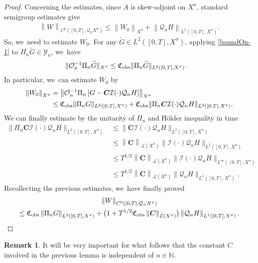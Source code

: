 \documentclass[10pt]{amsart}
\theoremstyle{definition}
\newtheorem{remark}[theorem]{Remark}
\let\mc\mathcal
\renewcommand{\O}{\mc{O}}
\newcommand{\Y}{\mc{Y}}
\newcommand{\N}{\mathbb{N}}
\newcommand{\Q}{\mathcal{Q}}
\newcommand{\bC}{\boldsymbol{C}}
\providecommand{\norm}[1]{\lVert#1\rVert}
\newcommand\nor[2]{\left\|#1\right\|_{#2}}
\begin{document}
\begin{proof}
Concerning the estimates, since $A$ is skew-adjoint on $X^{\sigma}$, standard semigroup estimates give\vspace*{-3pt}
\begin{align}
\nor{W}{C^{0}([0,T],\Q_{n}X^{\sigma})}\leq \nor{W_{0}}{X^{\sigma}}+\nor{\Q_{n} H}{L^{1}([0,T],X^{\sigma})}.
\end{align}
So, we~need to estimate $W_{0}$. For any $\widetilde{G}\in L^2([0, T], X^\sigma)$, applying \eqref{boundOn-1} to $\Pi_n \widetilde{G}\in \Y_n$, we~have\vspace*{-3pt}
\begin{align*}
\norm{\O_n^{-1}\Pi_n \widetilde{G}}_{X^\sigma}&\leq \mathfrak{C}_{\textup{obs}}\norm{\Pi_n\widetilde{G}}_{L^2([0, T], X^\sigma)}.
\end{align*}
In particular, we~can estimate $W_{0}$ by\vspace*{-3pt}
\begin{align*}
\nor{W_{0}}{X^{\sigma}}&= \nor{\O_n^{-1}\Pi_n\left[G-\bC\mc{I}(\cdot)\Q_n H\right]}{X^{\sigma}}\\ &\leq \mathfrak{C}_{\textup{obs}}\norm{\Pi_nG}_{L^2([0, T], X^\sigma)}+\mathfrak{C}_{\textup{obs}}\norm{\Pi_n\bC\mc{I}(\cdot)\Q_n H}_{L^2([0, T], X^\sigma)}.
\end{align*}
We can finally estimate by the unitarity of $\Pi_{n}$ and Hölder inequality in time\vspace*{-3pt}
\begin{align*}
\norm{\Pi_n\bC\mc{I}(\cdot)\Q_n H}_{L^2([0, T], X^\sigma)}&\leq \norm{\bC\mc{I}(\cdot)\Q_n H}_{L^2([0, T], X^\sigma)}\\ &\leq \nor{\bC}{\mc{L}(X^\sigma)}\norm{\mc{I}(\cdot)\Q_n H}_{L^2([0, T], X^\sigma)}\\
&\leq T^{1/2}\nor{\bC}{\mc{L}(X^\sigma)}\norm{\mc{I}(\cdot)\Q_n H}_{L^{\infty}([0, T], X^\sigma)}\\ &\leq T^{1/2}\nor{\bC}{\mc{L}(X^\sigma)}\norm{\Q_n H}_{L^{1}([0, T], X^\sigma)}.
\end{align*}
Recollecting the previous estimates, we~have finally proved\vspace*{-8pt}
\begin{multline*}
\nor{W}{C^{0}([0,T],\Q_{n}X^{\sigma})}\\\leq \mathfrak{C}_{\textup{obs}} \nor{\Pi_{n}G}{L^{2}([0,T],X^{\sigma})}+\bigl(1+T^{1/2}\mathfrak{C}_{\textup{obs}}\nor{\bC}{\mc{L}(X^\sigma)}\bigr)\nor{\Q_{n} H}{L^{1}([0,T],X^{\sigma})}.\qedhere
\end{multline*}
\end{proof}
\begin{remark}
It will be very important for what follows that the constant $C$ involved in the previous lemma is independent of $n\in\N$.
\end{remark}
\end{document}
